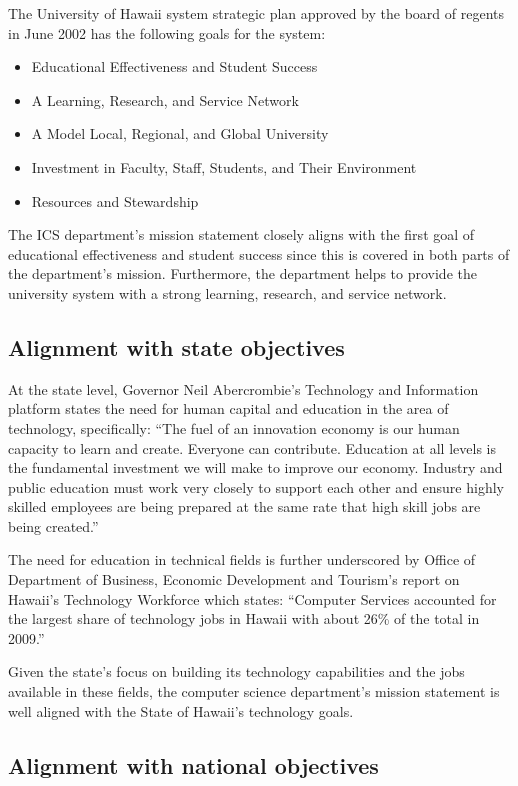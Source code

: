 \documentclass[12pt]{article}
\begin{document}
The University of Hawaii system strategic plan  approved by the board of regents in June 2002 has the following goals for the system:
\begin{itemize}
\item Educational Effectiveness and Student Success
\item A Learning, Research, and Service Network
\item A Model Local, Regional, and Global University
\item Investment in Faculty, Staff, Students, and Their Environment
\item Resources and Stewardship
\end{itemize}

The ICS department’s mission statement closely aligns with the first goal
of educational effectiveness and student success since this is covered in
both parts of the department’s mission. Furthermore, the department helps
to provide the university system with a strong learning, research, and
service network.

\subsection{Alignment with state objectives}

At the state level, Governor Neil Abercrombie’s Technology and Information
platform states the need for human capital and education in the area of
technology, specifically: “The fuel of an innovation economy is our human
capacity to learn and create. Everyone can contribute. Education at all
levels is the fundamental investment we will make to improve our
economy. Industry and public education must work very closely to support
each other and ensure highly skilled employees are being prepared at the
same rate that high skill jobs are being created.”

The need for education in technical fields is further underscored by Office
of Department of Business, Economic Development and Tourism’s report on
Hawaii’s Technology Workforce which states: “Computer Services accounted
for the largest share of technology jobs in Hawaii with about 26\% of the
total in 2009.”

Given the state's focus on building its technology capabilities and the
jobs available in these fields, the computer science department’s mission
statement is well aligned with the State of Hawaii’s technology goals.

\subsection{Alignment with national objectives}
\end{document}
